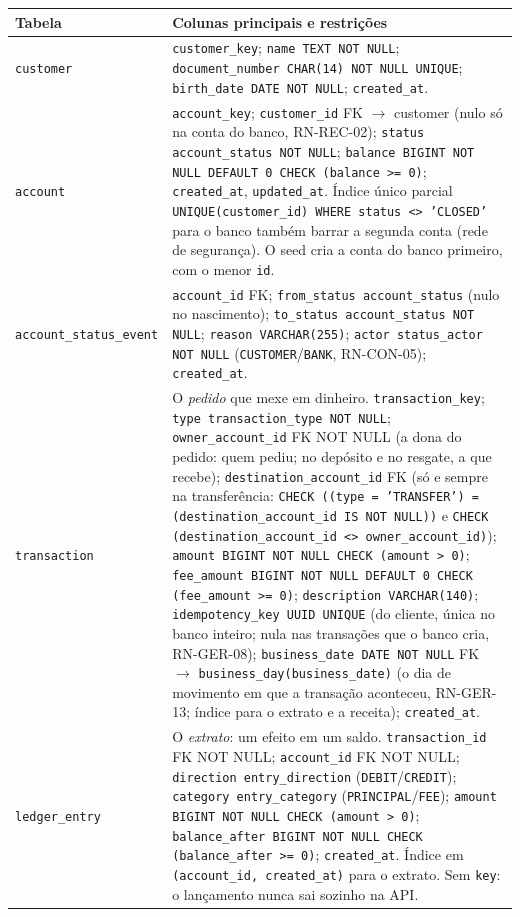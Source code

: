 \documentclass[11pt,a4paper]{article}
\newcommand{\tb}[1]{\texttt{#1}}           %
\begin{document}
\begin{longtable}{@{}P{3.4cm}P{12.7cm}@{}}
\toprule
\textbf{Tabela} & \textbf{Colunas principais e restrições} \\
\midrule
\endhead
\tb{customer} & \tb{customer_key}; \tb{name TEXT NOT NULL}; \tb{document_number CHAR(14) NOT NULL UNIQUE}; \tb{birth_date DATE NOT NULL}; \tb{created_at}. \\
\tb{account} & \tb{account_key}; \tb{customer_id} FK $\to$ customer (nulo só na conta do banco, RN-REC-02); \tb{status account_status NOT NULL}; \tb{balance BIGINT NOT NULL DEFAULT 0 CHECK (balance >= 0)}; \tb{created_at}, \tb{updated_at}. Índice único parcial \tb{UNIQUE(customer_id) WHERE status <> 'CLOSED'} para o banco também barrar a segunda conta (rede de segurança). O seed cria a conta do banco primeiro, com o menor \tb{id}. \\
\tb{account_status_event} & \tb{account_id} FK; \tb{from_status account_status} (nulo no nascimento); \tb{to_status account_status NOT NULL}; \tb{reason VARCHAR(255)}; \tb{actor status_actor NOT NULL} (\tb{CUSTOMER}/\tb{BANK}, RN-CON-05); \tb{created_at}. \\
\tb{transaction} & O \emph{pedido} que mexe em dinheiro. \tb{transaction_key}; \tb{type transaction_type NOT NULL}; \tb{owner_account_id} FK NOT NULL (a dona do pedido: quem pediu; no depósito e no resgate, a que recebe); \tb{destination_account_id} FK (só e sempre na transferência: \tb{CHECK ((type = 'TRANSFER') = (destination_account_id IS NOT NULL))} e \tb{CHECK (destination_account_id <> owner_account_id)}); \tb{amount BIGINT NOT NULL CHECK (amount > 0)}; \tb{fee_amount BIGINT NOT NULL DEFAULT 0 CHECK (fee_amount >= 0)}; \tb{description VARCHAR(140)}; \tb{idempotency_key UUID UNIQUE} (do cliente, única no banco inteiro; nula nas transações que o banco cria, RN-GER-08); \tb{business_date DATE NOT NULL} FK $\to$ \tb{business_day(business_date)} (o dia de movimento em que a transação aconteceu, RN-GER-13; índice para o extrato e a receita); \tb{created_at}. \\
\tb{ledger_entry} & O \emph{extrato}: um efeito em um saldo. \tb{transaction_id} FK NOT NULL; \tb{account_id} FK NOT NULL; \tb{direction entry_direction} (\tb{DEBIT}/\tb{CREDIT}); \tb{category entry_category} (\tb{PRINCIPAL}/\tb{FEE}); \tb{amount BIGINT NOT NULL CHECK (amount > 0)}; \tb{balance_after BIGINT NOT NULL CHECK (balance_after >= 0)}; \tb{created_at}. Índice em \tb{(account_id, created_at)} para o extrato. Sem \tb{key}: o lançamento nunca sai sozinho na API. \\
\bottomrule
\end{longtable}
\end{document}
